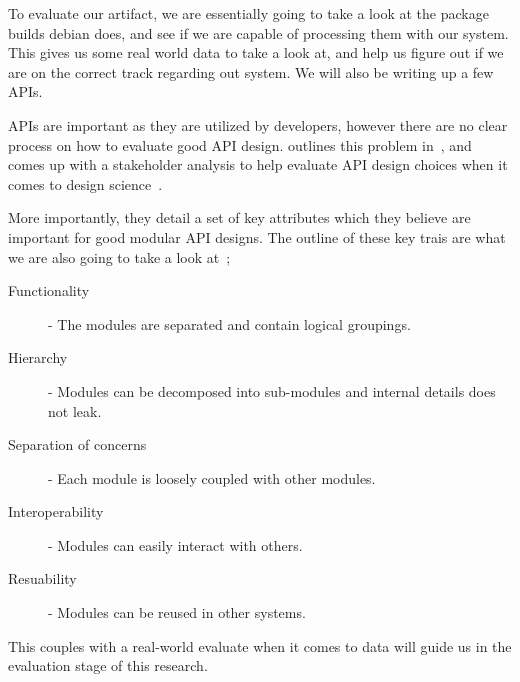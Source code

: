 \documentclass[../Main/thesis.tex]{subfiles}
\begin{document}
To evaluate our artifact, we are essentially going to take a look at the package
builds debian does, and see if we are capable of processing them with our
system. This gives us some real world data to take a look at, and help us figure
out if we are on the correct track regarding out system. We will also be writing
up a few APIs. 

APIs are important as they are utilized by developers, however there are no
clear process on how to evaluate good API design.
\citeauthor{Iyer:2012:EAC:2342209.2342213} outlines this problem
in~, and comes up with a stakeholder
analysis to help evaluate API design choices when it comes to design
science~\cite{Iyer:2012:EAC:2342209.2342213}.

More importantly, they detail a set of key attributes which they believe are
important for good modular API designs.  
The outline of these key trais are what we are also going to take a look at~\cite[p.~31]{Iyer:2012:EAC:2342209.2342213};
\begin{description}
    \item[Functionality] - The modules are separated and contain logical groupings.
    \item[Hierarchy] - Modules can be decomposed into sub-modules and internal details does not leak.
    \item[Separation of concerns] - Each module is loosely coupled with other modules.
    \item[Interoperability] - Modules can easily interact with others.
    \item[Resuability] - Modules can be reused in other systems.
\end{description}

This couples with a real-world evaluate when it comes to data will guide us in
the evaluation stage of this research.


\blankpage
\end{document}
